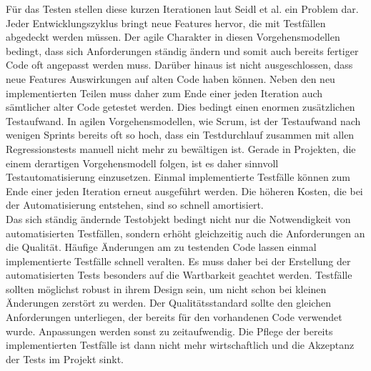 Für das Testen stellen diese kurzen Iterationen laut  Seidl et al. \cite[vgl. S.24]{seidl_basiswissen_2012} ein Problem dar.
Jeder Entwicklungszyklus bringt neue Features hervor, die mit Testfällen abgedeckt werden müssen. Der agile Charakter in diesen Vorgehensmodellen bedingt, dass sich Anforderungen ständig ändern und somit auch bereits fertiger Code oft angepasst werden muss. Darüber hinaus ist nicht ausgeschlossen, dass neue Features Auswirkungen auf alten Code haben können. Neben den neu implementierten Teilen muss daher zum Ende einer jeden Iteration auch sämtlicher alter Code getestet werden.
Dies bedingt einen enormen zusätzlichen Testaufwand. 
In agilen Vorgehensmodellen, wie Scrum, ist der Testaufwand nach wenigen Sprints bereits oft so hoch, dass ein Testdurchlauf zusammen mit allen Regressionstests manuell nicht mehr zu bewältigen ist.
Gerade in Projekten, die einem derartigen Vorgehensmodell folgen, ist es daher sinnvoll Testautomatisierung einzusetzen. Einmal implementierte Testfälle können zum Ende einer jeden Iteration erneut ausgeführt werden. Die höheren Kosten, die bei der Automatisierung entstehen, sind so schnell amortisiert.\\
Das sich ständig ändernde Testobjekt bedingt nicht nur die Notwendigkeit von automatisierten Testfällen, sondern erhöht gleichzeitig auch die Anforderungen an die Qualität. Häufige Änderungen am zu testenden Code lassen einmal implementierte Testfälle schnell veralten. Es muss daher bei der Erstellung der automatisierten Tests besonders auf die Wartbarkeit geachtet werden.
Testfälle sollten möglichst robust in ihrem Design sein, um nicht schon bei kleinen Änderungen zerstört zu werden. Der Qualitätsstandard sollte den gleichen Anforderungen unterliegen, der bereits für den vorhandenen Code verwendet wurde. Anpassungen werden sonst zu zeitaufwendig. Die Pflege der bereits implementierten Testfälle ist dann nicht mehr wirtschaftlich und die Akzeptanz der Tests im Projekt sinkt.
